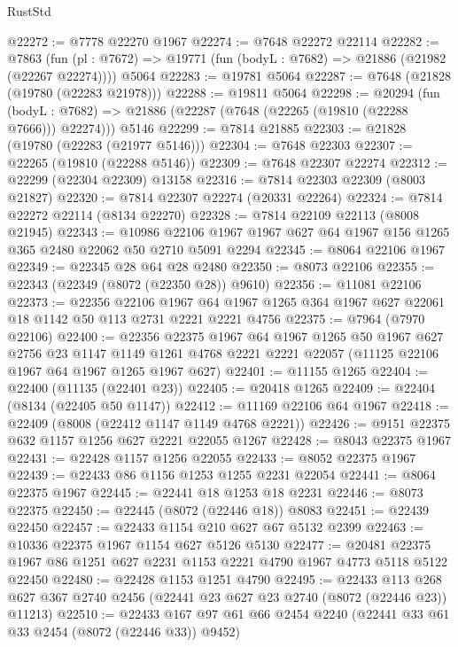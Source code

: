\begin{lexlean}{RustStd}
\begin{coremodule}
@22272 := @7778 @22270 @1967
@22274 := @7648 @22272 @22114
@22282 := @7863
    (fun (pl : @7672) => @19771 (fun (bodyL : @7682) => @21886 (@21982 (@22267 @22274))))
    @5064
@22283 := @19781 @5064
@22287 := @7648 (@21828 (@19780 (@22283 @21978)))
@22288 := @19811 @5064
@22298 := @20294
    (fun (bodyL : @7682) => @21886 (@22287 (@7648 (@22265 (@19810 (@22288 @7666))) @22274)))
    @5146
@22299 := @7814 @21885
@22303 := @21828 (@19780 (@22283 (@21977 @5146)))
@22304 := @7648 @22303
@22307 := @22265 (@19810 (@22288 @5146))
@22309 := @7648 @22307 @22274
@22312 := @22299 (@22304 @22309) @13158
@22316 := @7814 @22303 @22309 (@8003 @21827)
@22320 := @7814 @22307 @22274 (@20331 @22264)
@22324 := @7814 @22272 @22114 (@8134 @22270)
@22328 := @7814 @22109 @22113 (@8008 @21945)
@22343 := @10986
    @22106
    @1967
    @1967
    @627
    @64
    @1967
    @156
    @1265
    @365
    @2480
    @22062
    @50
    @2710
    @5091
    @2294
@22345 := @8064 @22106 @1967
@22349 := @22345 @28 @64 @28 @2480
@22350 := @8073 @22106
@22355 := @22343 (@22349 (@8072 (@22350 @28)) @9610)
@22356 := @11081 @22106
@22373 := @22356
    @22106
    @1967
    @64
    @1967
    @1265
    @364
    @1967
    @627
    @22061
    @18
    @1142
    @50
    @113
    @2731
    @2221
    @2221
    @4756
@22375 := @7964 (@7970 @22106)
@22400 := @22356
    @22375
    @1967
    @64
    @1967
    @1265
    @50
    @1967
    @627
    @2756
    @23
    @1147
    @1149
    @1261
    @4768
    @2221
    @2221
    @22057
    (@11125 @22106 @1967 @64 @1967 @1265 @1967 @627)
@22401 := @11155 @1265
@22404 := @22400 (@11135 (@22401 @23))
@22405 := @20418 @1265
@22409 := @22404 (@8134 (@22405 @50 @1147))
@22412 := @11169 @22106 @64 @1967
@22418 := @22409 (@8008 (@22412 @1147 @1149 @4768 @2221))
@22426 := @9151 @22375 @632 @1157 @1256 @627 @2221 @22055 @1267
@22428 := @8043 @22375 @1967
@22431 := @22428 @1157 @1256 @22055
@22433 := @8052 @22375 @1967
@22439 := @22433 @86 @1156 @1253 @1255 @2231 @22054
@22441 := @8064 @22375 @1967
@22445 := @22441 @18 @1253 @18 @2231
@22446 := @8073 @22375
@22450 := @22445 (@8072 (@22446 @18)) @8083
@22451 := @22439 @22450
@22457 := @22433 @1154 @210 @627 @67 @5132 @2399
@22463 := @10336 @22375 @1967 @1154 @627 @5126 @5130
@22477 := @20481 @22375 @1967 @86 @1251 @627 @2231 @1153 @2221 @4790 @1967 @4773 @5118 @5122 @22450
@22480 := @22428 @1153 @1251 @4790
@22495 := @22433
    @113
    @268
    @627
    @367
    @2740
    @2456
    (@22441 @23 @627 @23 @2740 (@8072 (@22446 @23)) @11213)
@22510 := @22433 @167 @97 @61 @66 @2454 @2240 (@22441 @33 @61 @33 @2454 (@8072 (@22446 @33)) @9452)

\end{coremodule}
\end{lexlean}
